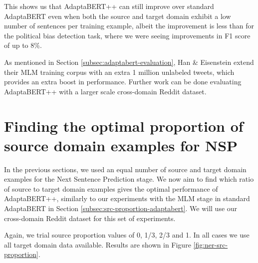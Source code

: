 This shows us that AdaptaBERT++ can still improve over standard AdaptaBERT even when both the source and target domain exhibit a low number of sentences per training example, albeit the improvement is less than for the political bias detection task, where we were seeing improvements in F1 score of up to 8\%.

As mentioned in Section \ref{subsec:adaptabert-evaluation}, Han \& Eisenstein extend their MLM training corpus with an extra 1 million unlabeled tweets, which provides an extra boost in performance. Further work can be done evaluating AdaptaBERT++ with a larger scale cross-domain Reddit dataset.

\section{Finding the optimal proportion of source domain examples for NSP}

In the previous sections, we used an equal number of source and target domain examples for the Next Sentence Prediction stage. We now aim to find which ratio of source to target domain examples gives the optimal performance of AdaptaBERT++, similarly to our experiments with the MLM stage in standard AdaptaBERT in Section \ref{subsec:src-proportion-adaptabert}. We will use our cross-domain Reddit dataset for this set of experiments.

Again, we trial source proportion values of 0, 1/3, 2/3 and 1. In all cases we use all target domain data available. Results are shown in Figure \ref{fig:ner-src-proportion}.

